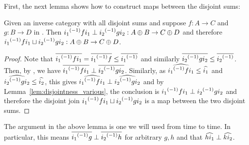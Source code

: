 First, the next lemma shows how to construct maps between the disjoint sums:
\begin{lemma}\label{lem:disjoint_sum_maps_are_perp}
  Given \X an inverse category with all disjoint sums and suppose $f:A \to C$ and $g:B\to D$ in
  \X. Then  ${i_1}^{(-1)} f i_1 \perp {i_2}^{(-1)} g i_2 : A\oplus B\to C\oplus D$ and therefore
  ${i_1}^{(-1)} f i_1 \sqcup {i_2}^{(-1)} g i_2 : A\oplus B\to C\oplus D$.
\end{lemma}
\begin{proof}
  Note that $\overline{{i_1}^{(-1)} f i_1} = \overline{{i_1}^{(-1)} f} \le \overline{{i_1}^{(-1)}}$ and similarly
  $\overline{{i_2}^{(-1)} g i_2} \le \overline{{i_2}^{(-1)}}$. Then, by , we have
  $\overline{{i_1}^{(-1)} f i_1} \perp \overline{{i_2}^{(-1)} g i_2}$.
  Similarly, as $\widehat{{i_1}^{(-1)} f i_1} \le \widehat{i_1}$ and  $\widehat{{i_2}^{(-1)} g i_2} \le \widehat{i_2}$,
  this gives $\widehat{{i_1}^{(-1)} f i_1} \perp \widehat{{i_2}^{(-1)} g i_2}$ and by
  Lemma~\ref{lem:disjointness_various}, the conclusion is ${i_1}^{(-1)} f i_1\perp {i_2}^{(-1)} g i_2$
  and therefore the disjoint join ${i_1}^{(-1)} f i_1 \sqcup {i_2}^{(-1)} g i_2$ is a map between the two
  disjoint sums.
\end{proof}

The argument in the above lemma is one we will used from time to time. In particular, this means
$\overline{{i_1}^{(-1)} g} \perp \overline{{i_2}^{(-1)} h}$ for arbitrary $g,h$ and that
$\widehat{h i_1} \perp \widehat{k i_2}$.

